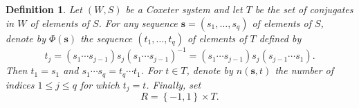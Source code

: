 \documentclass{article}
\theoremstyle{thmstyle}
\theoremstyle{defstyle}
\newtheorem{definition}[theorem]{Definition}
\renewcommand{\le}{\leqslant}
\begin{document}
\begin{definition}
    Let $(W, S)$ be a Coxeter system and let $T$ be the set of conjugates in $W$ of elements of $S$. For any sequence $\mathbf s = (s_1,\dots,s_q)$ of elements of $S$, denote by $\Phi(\mathbf s)$ the sequence $(t_1,\dots,t_q)$ of elements of $T$ defined by 
    \begin{equation*}
        t_j = (s_1\cdots s_{j - 1}) s_j(s_1\cdots s_{j - 1})^{-1} = (s_1\cdots s_{ j- 1})s_j(s_{j - 1}\cdots s_1).
    \end{equation*}
    Then $t_1 = s_1$ and $s_1\cdots s_q = t_q\cdots t_1$. For $t\in T$, denote by $n(\mathbf s, t)$ the number of indices $1\le j\le q$ for which $t_j = t$. Finally, set 
    \begin{equation*}
        R = \left\{-1, 1\right\}\times T.
    \end{equation*}
\end{definition}
\end{document}
